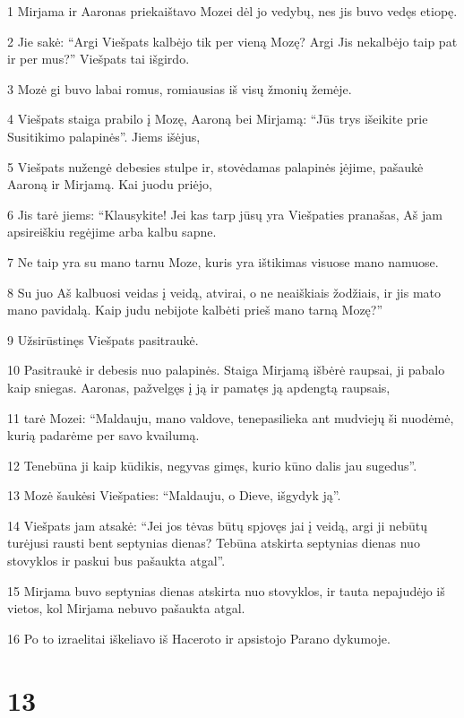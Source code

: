 \par 1 Mirjama ir Aaronas priekaištavo Mozei dėl jo vedybų, nes jis buvo vedęs etiopę. 
\par 2 Jie sakė: “Argi Viešpats kalbėjo tik per vieną Mozę? Argi Jis nekalbėjo taip pat ir per mus?” Viešpats tai išgirdo. 
\par 3 Mozė gi buvo labai romus, romiausias iš visų žmonių žemėje. 
\par 4 Viešpats staiga prabilo į Mozę, Aaroną bei Mirjamą: “Jūs trys išeikite prie Susitikimo palapinės”. Jiems išėjus, 
\par 5 Viešpats nužengė debesies stulpe ir, stovėdamas palapinės įėjime, pašaukė Aaroną ir Mirjamą. Kai juodu priėjo, 
\par 6 Jis tarė jiems: “Klausykite! Jei kas tarp jūsų yra Viešpaties pranašas, Aš jam apsireiškiu regėjime arba kalbu sapne. 
\par 7 Ne taip yra su mano tarnu Moze, kuris yra ištikimas visuose mano namuose. 
\par 8 Su juo Aš kalbuosi veidas į veidą, atvirai, o ne neaiškiais žodžiais, ir jis mato mano pavidalą. Kaip judu nebijote kalbėti prieš mano tarną Mozę?” 
\par 9 Užsirūstinęs Viešpats pasitraukė. 
\par 10 Pasitraukė ir debesis nuo palapinės. Staiga Mirjamą išbėrė raupsai, ji pabalo kaip sniegas. Aaronas, pažvelgęs į ją ir pamatęs ją apdengtą raupsais, 
\par 11 tarė Mozei: “Maldauju, mano valdove, tenepasilieka ant mudviejų ši nuodėmė, kurią padarėme per savo kvailumą. 
\par 12 Tenebūna ji kaip kūdikis, negyvas gimęs, kurio kūno dalis jau sugedus”. 
\par 13 Mozė šaukėsi Viešpaties: “Maldauju, o Dieve, išgydyk ją”. 
\par 14 Viešpats jam atsakė: “Jei jos tėvas būtų spjovęs jai į veidą, argi ji nebūtų turėjusi rausti bent septynias dienas? Tebūna atskirta septynias dienas nuo stovyklos ir paskui bus pašaukta atgal”. 
\par 15 Mirjama buvo septynias dienas atskirta nuo stovyklos, ir tauta nepajudėjo iš vietos, kol Mirjama nebuvo pašaukta atgal. 
\par 16 Po to izraelitai iškeliavo iš Haceroto ir apsistojo Parano dykumoje.



\chapter{13}


